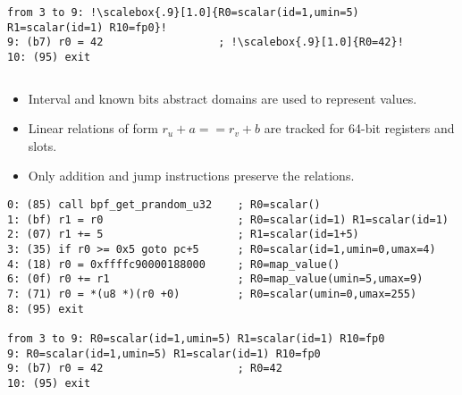 \documentclass{beamer}
\begin{document}
\begin{frame}
\begin{columns}[t]
\begin{verbatim}
from 3 to 9: !\scalebox{.9}[1.0]{R0=scalar(id=1,umin=5) R1=scalar(id=1) R10=fp0}!
9: (b7) r0 = 42                  ; !\scalebox{.9}[1.0]{R0=42}!
10: (95) exit      
    \end{verbatim}
  \end{columns}

  \framebreak

    \scriptsize
    \begin{itemize}
    \item Interval and known bits abstract domains are used to represent values.
    \item Linear relations of form $r_u + a == r_v + b$ are tracked
      for 64-bit registers and slots.
    \item Only addition and jump instructions preserve the relations.
    \end{itemize}

    \begin{verbatim}
0: (85) call bpf_get_prandom_u32    ; R0=scalar()
1: (bf) r1 = r0                     ; R0=scalar(id=1) R1=scalar(id=1)
2: (07) r1 += 5                     ; R1=scalar(id=1+5)
3: (35) if r0 >= 0x5 goto pc+5      ; R0=scalar(id=1,umin=0,umax=4)
4: (18) r0 = 0xffffc90000188000     ; R0=map_value()
6: (0f) r0 += r1                    ; R0=map_value(umin=5,umax=9)
7: (71) r0 = *(u8 *)(r0 +0)         ; R0=scalar(umin=0,umax=255)
8: (95) exit

from 3 to 9: R0=scalar(id=1,umin=5) R1=scalar(id=1) R10=fp0
9: R0=scalar(id=1,umin=5) R1=scalar(id=1) R10=fp0
9: (b7) r0 = 42                     ; R0=42
10: (95) exit      
    \end{verbatim}

    

\end{frame}
\end{document}
